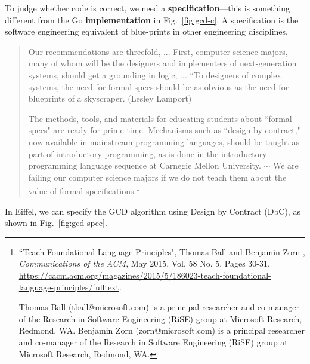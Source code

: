 \documentclass[runningheads,12pt]{article}
\begin{document}
To judge whether code is correct, we need a \textbf{specification}---this is something different from the Go \textbf{implementation} in Fig.~\ref{fig:gcd-c}. A specification is the software engineering equivalent of blue-prints in other engineering disciplines.

\begin{quote}

Our recommendations are threefold, ... First, computer science majors, many of whom will be the designers and implementers of next-generation systems, should get a grounding in logic, ... “To designers of complex systems, the need for formal specs should be as obvious as the need for blueprints of a skyscraper. (Lesley Lamport) 

The methods, tools, and materials for educating students about ``formal specs" are ready for prime time. Mechanisms such as ``design by contract," now available in mainstream programming languages, should be taught as part of introductory programming, as is done in the introductory programming language sequence at Carnegie Mellon University. $\cdots$ We are failing our computer science majors if we do not teach them about the value of formal specifications.\footnote{%
``Teach Foundational Language Principles", Thomas Ball and Benjamin Zorn , \textit{Communications of the ACM}, May 2015, Vol. 58 No. 5, Pages 30-31. \url{https://cacm.acm.org/magazines/2015/5/186023-teach-foundational-language-principles/fulltext}. 

Thomas Ball (tball@microsoft.com) is a principal researcher and co-manager of the Research in Software Engineering (RiSE) group at Microsoft Research, Redmond, WA. Benjamin Zorn (zorn@microsoft.com) is a principal researcher and co-manager of the Research in Software Engineering (RiSE) group at Microsoft Research, Redmond, WA.} 
\end{quote}

In Eiffel, we can specify the GCD algorithm using Design by Contract (DbC), as shown in Fig.~\ref{fig:gcd-spec}.
\end{document}
